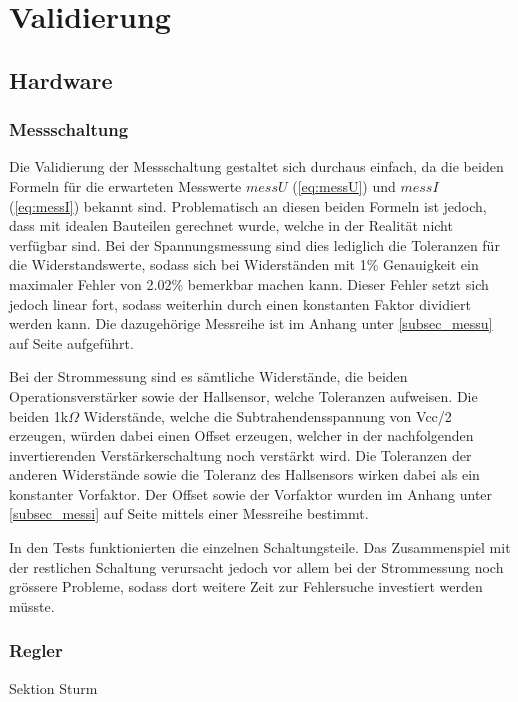 \section{Validierung}

\subsection{Hardware}

\subsubsection{Messschaltung}
Die Validierung der Messschaltung gestaltet sich durchaus einfach, da die beiden Formeln für die erwarteten Messwerte $messU$ (\ref{eq:messU}) und $messI$ (\ref{eq:messI}) bekannt sind. Problematisch an diesen beiden Formeln ist jedoch, dass mit idealen Bauteilen gerechnet wurde, welche in der Realität nicht verfügbar sind. Bei der Spannungsmessung sind dies lediglich die Toleranzen für die Widerstandswerte, sodass sich bei Widerständen mit 1\% Genauigkeit ein maximaler Fehler von 2.02\% bemerkbar machen kann. Dieser Fehler setzt sich jedoch linear fort, sodass weiterhin durch einen konstanten Faktor dividiert werden kann. Die dazugehörige Messreihe ist im Anhang unter \ref{subsec_messu} auf Seite \pageref{subsec_messu} aufgeführt.

Bei der Strommessung sind es sämtliche Widerstände, die beiden Operationsverstärker sowie der Hallsensor, welche Toleranzen aufweisen. Die beiden 1k$\Omega$ Widerstände, welche die Subtrahendensspannung von Vcc/2 erzeugen, würden dabei einen Offset erzeugen, welcher in der nachfolgenden invertierenden Verstärkerschaltung noch verstärkt wird. Die Toleranzen der anderen Widerstände sowie die Toleranz des Hallsensors wirken dabei als ein konstanter Vorfaktor. Der Offset sowie der Vorfaktor wurden im Anhang unter \ref{subsec_messi} auf Seite \pageref{subsec_messi} mittels einer Messreihe bestimmt.

In den Tests funktionierten die einzelnen Schaltungsteile. Das Zusammenspiel mit der restlichen Schaltung verursacht jedoch vor allem bei der Strommessung noch grössere Probleme, sodass dort weitere Zeit zur Fehlersuche investiert werden müsste.

\subsubsection{Regler}\label{subsec:ValRegler}

Sektion Sturm

